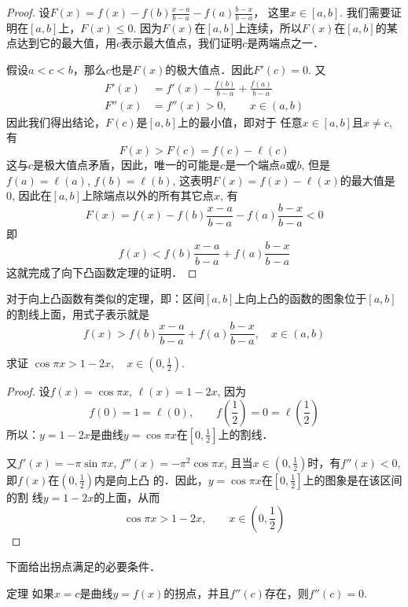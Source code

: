 \begin{proof}
    设$F(x)=f(x)-f(b)\frac{x-a}{b-a}-f(a)\frac{b-x}{b-a}$，
    这里$x\in [a,b]$. 我们需要证明在$[a,b]$上，$F(x)\le 0$. 因为$F(x)$在$[a,b]$上连续，所以$F(x)$在$[a,b]$的某点达到它的最大值，用$c$表示最大值点，我们证明$c$是两端点之一．
    
    假设$a<c<b$，那么$c$也是$F(x)$的极大值点．因此$F'(c)=0$. 又
    \begin{align*}
        F'(x)&=f'(x)-\frac{f(b)}{b-a}+\frac{f(a)}{b-a}\\
        F''(x)&=f''(x)>0,\qquad x\in(a,b)
    \end{align*}
    因此我们得出结论，$F(c)$是$[a,b]$上的最小值，即对于
    任意$x\in [a,b]$且$x\ne c$, 有
    \[F (x) > F (c) =f (c) -\ell (c)\]
    这与$c$是极大值点矛盾，因此，唯一的可能是$c$是一个端点$a$或$b$, 但是$f(a)=\ell(a)$, $f(b)=\ell(b)$, 这表明$F(x)=f(x)-\ell(x)$的最大值是0, 因此在$[a,b]$上除端点以外的所有其它点$x$, 有
    \[F (x) =f (x) -f (b) \frac{x-a}{b-a}-f (a) \frac{b-x}{b-a}<0\]
    即
    \[f (x)<f (b) \frac{x-a}{b-a}+f (a) \frac{b-x}{b-a}\]
    这就完成了向下凸函数定理的证明．
    \end{proof}
    
    对于向上凸函数有类似的定理，即：区间$[a,b]$上向上凸的函数的图象位于$[a,b]$的割线上面，用式子表示就是
    \[f (x)>f (b) \frac{x-a}{b-a}+f (a) \frac{b-x}{b-a},\quad x\in(a,b)\]
    
    \begin{example}
        求证 $\cos\pi x>1-2x,\quad x\in\left(0, \frac{1}{2}\right)$.
    \end{example}
    
    
    \begin{proof}
        设$f(x)=\cos\pi x$, $\ell (x)=1-2x$, 因为
    \[f (0) =1=\ell (0) ,\qquad f \left(\frac{1}{2}\right) =0=\ell\left(\frac{1}{2}\right)\]
    所以：$y=1-2x$是曲线$y=\cos\pi x$在$\left[0,\frac{1}{2}\right]$上的割线．
    
    又$f'(x)=-\pi \sin\pi x$, $f''(x)=-\pi^2\cos\pi x$, 且当$x\in \left(0,\frac{1}{2}\right)$时，有$f''(x)<0$, 即$f(x)$在$\left(0,\frac{1}{2}\right)$内是向上凸
    的．因此，$y=\cos\pi x$在$\left[0,\frac{1}{2}\right]$上的图象是在该区间的割
    线$y=1-2x$的上面，从而
    \[\cos\pi x>1-2x,\qquad x\in \left(0,\frac{1}{2}\right)\]
    \end{proof}
    
    下面给出拐点满足的必要条件．
    
    \begin{blk}
        {定理} 如果$x=c$是曲线$y=f(x)$的拐点，并且$f''(c)$存在，则$f''(c)=0$.
    \end{blk}
    
